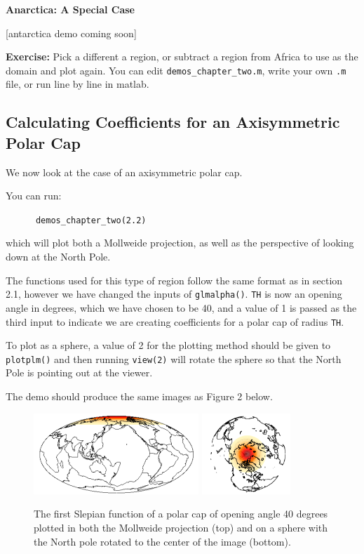 \documentclass[11pt]{article}
\begin{document}
\textbf{Anarctica: A Special Case}

[antarctica demo coming soon]

\textbf{Exercise:} Pick a different a region, or subtract a region from Africa to use as the domain and plot again. You can edit \verb|demos_chapter_two.m|, write your own \verb|.m| file, or run line by line in matlab.
 

\subsection{Calculating Coefficients for an Axisymmetric Polar Cap}

We now look at the case of an axisymmetric polar cap.

You can run:

\verb|		demos_chapter_two(2.2)|

which will plot both a Mollweide projection, as well as the perspective of looking down at the North Pole.

The functions used for this type of region follow the same format as in section 2.1, however we have changed the inputs of \verb|glmalpha()|. \verb|TH| is now an opening angle in degrees, which we have chosen to be 40, and a value of 1 is passed as the third input to indicate we are creating coefficients for a polar cap of radius \verb|TH|.

To plot as a sphere, a value of 2 for the plotting method should be given to \verb|plotplm()| and then running \verb|view(2)| will rotate the sphere so that the North Pole is pointing out at the viewer.

The demo should produce the same images as Figure 2 below.

\begin{figure}[H]
  \centering
  \includegraphics[height=1.2in]{figures/figure2A.png}
  \includegraphics[height=1.2in]{figures/figure2B.png}
  \caption{The first Slepian function of a polar cap of opening angle 40 degrees plotted in both the Mollweide projection (top) and on a sphere with the North pole rotated to the center of the image (bottom).}
   \label{figure2}
\end{figure}
\end{document}
